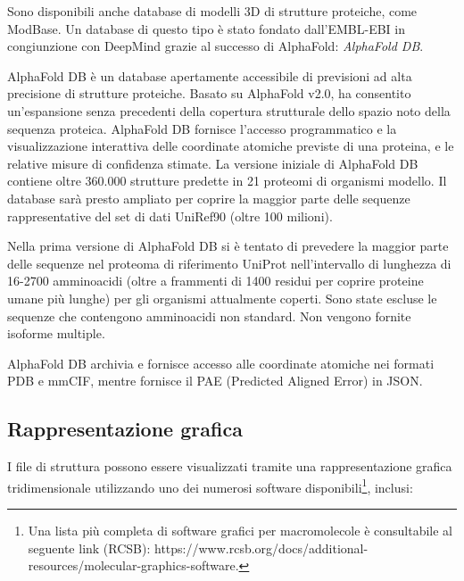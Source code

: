 \par Sono disponibili anche database di modelli 3D di strutture proteiche, come ModBase. Un database di questo tipo è stato fondato dall'EMBL-EBI in congiunzione con DeepMind grazie al successo di AlphaFold: \textit{AlphaFold DB}.

\par AlphaFold DB è un database apertamente accessibile di previsioni ad alta precisione di strutture proteiche. Basato su AlphaFold v2.0, ha consentito un'espansione senza precedenti della copertura strutturale dello spazio noto della sequenza proteica. AlphaFold DB fornisce l'accesso programmatico e la visualizzazione interattiva delle coordinate atomiche previste di una proteina, e le relative misure di confidenza stimate. La versione iniziale di AlphaFold DB contiene oltre 360.000 strutture predette in 21 proteomi di organismi modello. Il database sarà presto ampliato per coprire la maggior parte delle sequenze rappresentative del set di dati UniRef90 (oltre 100 milioni)\supercite{varadi2021alphafold}.

\par Nella prima versione di AlphaFold DB si è tentato di prevedere la maggior parte delle sequenze nel proteoma di riferimento UniProt nell'intervallo di lunghezza di 16-2700 amminoacidi (oltre a frammenti di 1400 residui per coprire proteine umane più lunghe) per gli organismi attualmente coperti. Sono state escluse le sequenze che contengono amminoacidi non standard. Non vengono fornite isoforme multiple.

\par AlphaFold DB archivia e fornisce accesso alle coordinate atomiche nei formati PDB e mmCIF, mentre fornisce il PAE (Predicted Aligned Error) in JSON.



\subsection{Rappresentazione grafica}

I file di struttura possono essere visualizzati tramite una rappresentazione grafica tridimensionale utilizzando uno dei numerosi software disponibili\footnote{Una lista più completa di software grafici per macromolecole è consultabile al seguente link (RCSB): https://www.rcsb.org/docs/additional-resources/molecular-graphics-software.}, inclusi:

